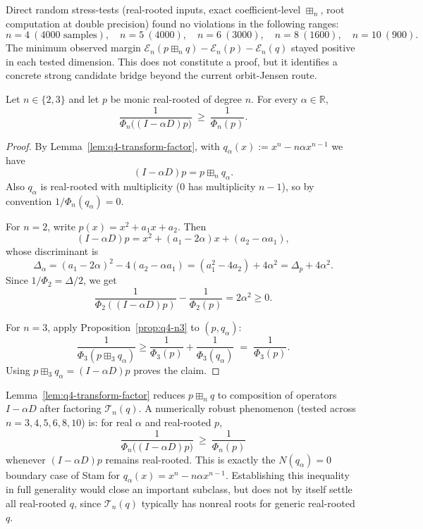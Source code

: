 \begin{remark}
Direct random stress-tests (real-rooted inputs, exact coefficient-level
$\boxplus_n$, root computation at double precision) found no violations in the following ranges:
\[
n=4\ (4000\text{ samples}),\quad
n=5\ (4000),\quad
n=6\ (3000),\quad
n=8\ (1600),\quad
n=10\ (900).
\]
The minimum observed margin
$\mathcal E_n(p\boxplus_n q)-\mathcal E_n(p)-\mathcal E_n(q)$
stayed positive in each tested dimension.
This does not constitute a proof, but it identifies a concrete strong
candidate bridge beyond the current orbit-Jensen route.
\end{remark}

\begin{proposition}[First-order step monotonicity is closed for $n=2,3$]\label{prop:q4-firststep-n23}
Let $n\in\{2,3\}$ and let $p$ be monic real-rooted of degree $n$.
For every $\alpha\in\mathbb R$,
\[
\frac1{\Phi_n\!\big((I-\alpha D)p\big)}\ \ge\ \frac1{\Phi_n(p)}.
\]
\end{proposition}

\begin{proof}
By Lemma~\ref{lem:q4-transform-factor}, with
$q_\alpha(x):=x^n-n\alpha x^{n-1}$ we have
\[
(I-\alpha D)p = p\boxplus_n q_\alpha.
\]
Also $q_\alpha$ is real-rooted with multiplicity ($0$ has multiplicity $n-1$), so
by convention $1/\Phi_n(q_\alpha)=0$.

For $n=2$, write $p(x)=x^2+a_1x+a_2$.
Then
\[
(I-\alpha D)p=x^2+(a_1-2\alpha)x+(a_2-\alpha a_1),
\]
whose discriminant is
\[
\Delta_\alpha=(a_1-2\alpha)^2-4(a_2-\alpha a_1)
=(a_1^2-4a_2)+4\alpha^2=\Delta_p+4\alpha^2.
\]
Since $1/\Phi_2=\Delta/2$, we get
\[
\frac1{\Phi_2((I-\alpha D)p)}-\frac1{\Phi_2(p)}=2\alpha^2\ge 0.
\]

For $n=3$, apply Proposition~\ref{prop:q4-n3} to $(p,q_\alpha)$:
\[
\frac1{\Phi_3(p\boxplus_3 q_\alpha)}
\ge
\frac1{\Phi_3(p)}+\frac1{\Phi_3(q_\alpha)}
\;=\;\frac1{\Phi_3(p)}.
\]
Using $p\boxplus_3 q_\alpha=(I-\alpha D)p$ proves the claim.
\end{proof}

\begin{remark}
Lemma~\ref{lem:q4-transform-factor} reduces $p\boxplus_n q$ to composition of operators
$I-\alpha D$ after factoring $\mathcal T_n(q)$.
A numerically robust phenomenon (tested across $n=3,4,5,6,8,10$) is:
for real $\alpha$ and real-rooted $p$,
\[
\frac1{\Phi_n\!\big((I-\alpha D)p\big)}\ \ge\ \frac1{\Phi_n(p)}
\]
whenever $(I-\alpha D)p$ remains real-rooted.
This is exactly the $N(q_\alpha)=0$ boundary case of Stam for
$q_\alpha(x)=x^n-n\alpha x^{n-1}$.
Establishing this inequality in full generality would close an important subclass,
but does not by itself settle all real-rooted $q$, since
$\mathcal T_n(q)$ typically has nonreal roots for generic real-rooted $q$.
\end{remark}

